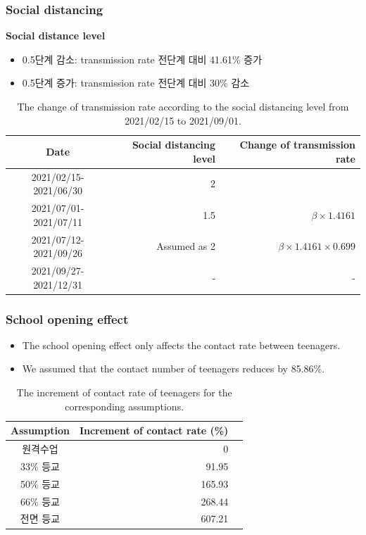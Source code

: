 \documentclass[aspectratio=169, 9pt, xcolor=dvipsnames]{beamer}
\begin{document}
	\begin{frame}\frametitle{Social distancing}
		\textbf{Social distance level}
		\begin{itemize}
			\item 0.5단계 감소: transmission rate 전단계 대비 41.61\% 증가
			\item 0.5단계 증가: transmission rate 전단계 대비 30\% 감소
		\end{itemize}
	    \begin{table}
	    	\begin{tabular}{crr}
	    		\toprule
	    		\textbf{Date} & \textbf{Social distancing level} & \textbf{Change of transmission rate} \\
	    		\midrule
	    		2021/02/15-2021/06/30 & 2 &  \\
	    		2021/07/01-2021/07/11 & 1.5 & $\beta \times 1.4161$ \\
	    		2021/07/12-2021/09/26 & Assumed as 2 & $\beta \times 1.4161 \times 0.699$ \\
	    		2021/09/27-2021/12/31\footnotemark[2] & - & - \\
	    		\bottomrule
	    	\end{tabular}
	    	\caption{The change of transmission rate according to the social distancing level from 2021/02/15 to 2021/09/01.}
	    \end{table}
	\end{frame}

	\begin{frame}\frametitle{School opening effect}
		\begin{itemize}
			\item The school opening effect only affects the contact rate between teenagers.
			\item We assumed that the contact number of teenagers reduces by 85.86\%.
		\end{itemize}
	    \begin{table}
	    	\begin{tabular}{crr}
	    		\toprule
	    		\textbf{Assumption} & \textbf{Increment of contact rate (\%)} \\
	    		\midrule
	    		원격수업 & 0 \\
	    		33\% 등교 & 91.95 \\
	    		50\% 등교 & 165.93 \\
	    		66\% 등교 & 268.44 \\
	    		전면 등교 & 607.21 \\
	    		\bottomrule
	    	\end{tabular}
	    	\caption{The increment of contact rate of teenagers for the corresponding assumptions.}
	    \end{table}
	\end{frame}
\end{document}
